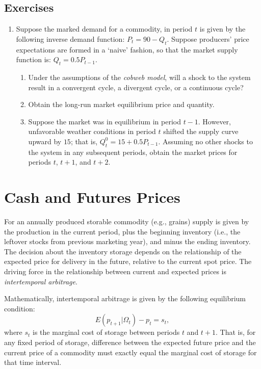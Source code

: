 \documentclass[
  oneside]{book}
\providecommand{\tightlist}{%
  \setlength{\itemsep}{0pt}\setlength{\parskip}{0pt}}
\begin{document}
\hypertarget{exercises-4}{%
\section*{Exercises}\label{exercises-4}}

\begin{enumerate}
\def\labelenumi{\arabic{enumi}.}
\tightlist
\item
  Suppose the marked demand for a commodity, in period \(t\) is given by the following inverse demand function: \(P_t = 90 - Q_t\). Suppose producers' price expectations are formed in a `naive' fashion, so that the market supply function is: \(Q_t = 0.5P_{t-1}\).

  \begin{enumerate}
  \def\labelenumii{\roman{enumii}.}
  \tightlist
  \item
    Under the assumptions of the \emph{cobweb model}, will a shock to the system result in a convergent cycle, a divergent cycle, or a continuous cycle?
  \item
    Obtain the long-run market equilibrium price and quantity.
  \item
    Suppose the market was in equilibrium in period \(t-1\). However, unfavorable weather conditions in period \(t\) shifted the supply curve upward by \(15\); that is, \(Q_t^{0} = 15+0.5P_{t-1}\). Assuming no other shocks to the system in any subsequent periods, obtain the market prices for periods \(t\), \(t+1\), and \(t+2\).
  \end{enumerate}
\end{enumerate}

\hypertarget{cash-and-futures-prices}{%
\chapter{Cash and Futures Prices}\label{cash-and-futures-prices}}

For an annually produced storable commodity (e.g., grains) supply is given by the production in the current period, plus the beginning inventory (i.e., the leftover stocks from previous marketing year), and minus the ending inventory. The decision about the inventory storage depends on the relationship of the expected price for delivery in the future, relative to the current spot price. The driving force in the relationship between current and expected prices is \emph{intertemporal arbitrage}.

Mathematically, intertemporal arbitrage is given by the following equilibrium condition: \[E\left(p_{t+1}|\Omega_t\right)-p_{t} = s_t,\] where \(s_t\) is the marginal cost of storage between periods \(t\) and \(t+1\). That is, for any fixed period of storage, difference between the expected future price and the current price of a commodity must exactly equal the marginal cost of storage for that time interval.
\end{document}
